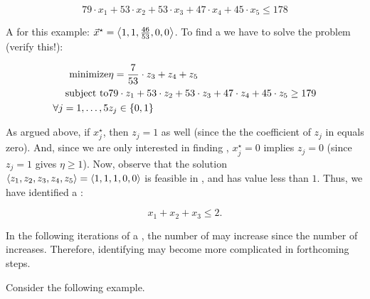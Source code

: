 \begin{example}
\begin{equation}
79\cdot x_1+53\cdot x_2+53\cdot x_3+47\cdot x_4+45\cdot x_5\leq178
\end{equation}

A  for this example: $\vec{x}^{\star}=\left\langle 1,1,\frac{46}{53},0,0 \right\rangle$. To find a  we have to solve the problem (verify this!):

\begin{eqnarray}
\mbox{minimize}&\eta=\frac{7}{53}\cdot z_3+z_4+z_5\eqnlab{sepco-ex-m}\\
\mbox{subject to}&79\cdot z_1+53\cdot z_2+53\cdot z_3+47\cdot z_4+45\cdot z_5\geq 179\eqnlab{sepco-ex-c1}\\
\forall\rangei[j]{1}{5}&z_j\in\accl{0,1}\eqnlab{sepco-ex-c2}
\end{eqnarray}

As argued above, if $x_j^{\star}$, then $z_j=1$ as well (since the the coefficient of $z_j$ in  equals zero). And, since we are only interested in finding , $x_j^{\star}=0$ implies $z_j=0$ (since $z_j=1$ gives $\eta\geq 1$). Now, observe that the solution $\left\langle z_1,z_2,z_3,z_4,z_5 \right\rangle=\left\langle 1,1,1,0,0 \right\rangle$ is feasible in , and has  value less than $1$. Thus, we have identified a :

\begin{equation}
x_1+x_2+x_3\leq2.
\end{equation}

In the following iterations of a , the number of  may increase since the number of  increases. Therefore, identifying  may become more complicated in forthcoming steps.
\end{example}

Consider the following example.

